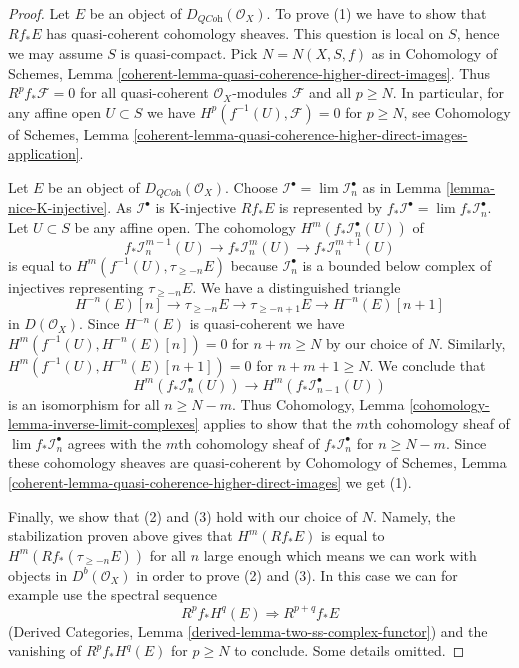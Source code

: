 \begin{proof}
Let $E$ be an object of $D_{\textit{QCoh}}(\mathcal{O}_X)$.
To prove (1) we have to show that $Rf_*E$ has quasi-coherent
cohomology sheaves. This question is local on $S$, hence we may
assume $S$ is quasi-compact. Pick $N = N(X, S, f)$ as in
Cohomology of Schemes, Lemma
\ref{coherent-lemma-quasi-coherence-higher-direct-images}.
Thus $R^pf_*\mathcal{F} = 0$ for all quasi-coherent $\mathcal{O}_X$-modules
$\mathcal{F}$ and all $p \geq N$. In particular, for any affine
open $U \subset S$ we have $H^p(f^{-1}(U), \mathcal{F}) = 0$
for $p \geq N$, see
Cohomology of Schemes, Lemma
\ref{coherent-lemma-quasi-coherence-higher-direct-images-application}.

\medskip\noindent
Let $E$ be an object of $D_{\textit{QCoh}}(\mathcal{O}_X)$.
Choose $\mathcal{I}^\bullet = \lim \mathcal{I}_n^\bullet$
as in Lemma \ref{lemma-nice-K-injective}.
As $\mathcal{I}^\bullet$ is K-injective $Rf_*E$ is represented by
$f_*\mathcal{I}^\bullet = \lim f_*\mathcal{I}_n^\bullet$.
Let $U \subset S$ be any affine open. The cohomology
$H^m(f_*\mathcal{I}_n^\bullet(U))$ of
$$
f_*\mathcal{I}_n^{m - 1}(U) \to
f_*\mathcal{I}_n^m(U) \to
f_*\mathcal{I}_n^{m + 1}(U)
$$
is equal to $H^m(f^{-1}(U), \tau_{\geq -n}E)$ because $\mathcal{I}_n^\bullet$
is a bounded below complex of injectives representing $\tau_{\geq -n}E$.
We have a distinguished triangle
$$
H^{-n}(E)[n] \to \tau_{\geq -n}E \to \tau_{\geq - n + 1}E \to H^{-n}(E)[n + 1]
$$
in $D(\mathcal{O}_X)$. Since $H^{-n}(E)$ is quasi-coherent we have
$H^m(f^{-1}(U), H^{-n}(E)[n]) = 0$ for $n + m \geq N$ by
our choice of $N$. Similarly, $H^m(f^{-1}(U), H^{-n}(E)[n + 1]) = 0$
for $n + m + 1 \geq N$. We conclude that
$$
H^m(f_*\mathcal{I}_n^\bullet(U)) \to H^m(f_*\mathcal{I}_{n - 1}^\bullet(U))
$$
is an isomorphism for all $n \geq N - m$. Thus
Cohomology, Lemma \ref{cohomology-lemma-inverse-limit-complexes}
applies to show that the $m$th cohomology sheaf of
$\lim f_*\mathcal{I}_n^\bullet$ agrees with the $m$th cohomology
sheaf of $f_*\mathcal{I}_n^\bullet$ for $n \geq N - m$. Since these
cohomology sheaves are quasi-coherent by
Cohomology of Schemes, Lemma
\ref{coherent-lemma-quasi-coherence-higher-direct-images}
we get (1).

\medskip\noindent
Finally, we show that (2) and (3) hold with our choice of $N$.
Namely, the stabilization proven above gives that $H^m(Rf_*E)$ is equal
to $H^m(Rf_*(\tau_{\geq -n}E))$ for all $n$ large enough which means we
can work with objects in $D^b(\mathcal{O}_X)$ in order to prove (2) and (3).
In this case we can for example use the spectral sequence
$$
R^pf_*H^q(E) \Rightarrow R^{p + q}f_*E
$$
(Derived Categories, Lemma \ref{derived-lemma-two-ss-complex-functor})
and the vanishing of $R^pf_*H^q(E)$ for $p \geq N$ to conclude.
Some details omitted.
\end{proof}

